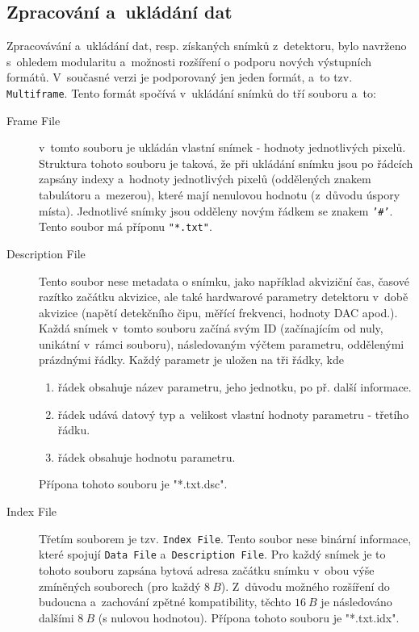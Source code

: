 \subsection{Zpracování a~ukládání dat}\label{atlas:cont:output}
Zpracovávání a~ukládání dat, resp. získaných snímků z~detektoru, bylo navrženo s~ohledem modularitu a~možnosti rozšíření o podporu nových výstupních formátů. V~současné verzi je podporovaný jen jeden formát, a~to tzv. \texttt{Multiframe}. Tento formát spočívá v~ukládání snímků do tří souboru a~to:
\begin{description}
	\item[Frame File] v~tomto souboru je ukládán vlastní snímek - hodnoty jednotlivých pixelů. Struktura tohoto souboru je taková, že při ukládání snímku jsou po řádcích zapsány indexy a~hodnoty jednotlivých pixelů (oddělených znakem tabulátoru a~mezerou), které mají nenulovou hodnotu (z~důvodu úspory místa). Jednotlivé snímky jsou odděleny novým řádkem se znakem \texttt{'\#'}. Tento soubor má příponu \texttt{"*.txt"}.
	\item[Description File] Tento soubor nese metadata o snímku, jako například akviziční čas, časové razítko začátku akvizice, ale také hardwarové parametry detektoru v~době akvizice (napětí detekčního čipu, měřící frekvenci, hodnoty DAC apod.). Každá snímek v~tomto souboru začíná svým ID (začínajícím od nuly, unikátní v~rámci souboru), následovaným výčtem parametru, oddělenými prázdnými řádky. Každý parametr je uložen na tři řádky, kde
		\begin{enumerate}
			\item řádek obsahuje název parametru, jeho jednotku, po př. další informace.
			\item řádek udává datový typ a~velikost vlastní hodnoty parametru - třetího řádku.
			\item řádek obsahuje hodnotu parametru.
		\end{enumerate}
	Přípona tohoto souboru je "*.txt.dsc".
	\item[Index File] Třetím souborem je tzv. \texttt{Index File}. Tento soubor nese binární informace, které spojují \texttt{Data File} a~\texttt{Description File}. Pro každý snímek je to tohoto souboru zapsána bytová adresa začátku snímku v~obou výše zmíněných souborech (pro každý $8~B$). Z~důvodu možného rozšíření do budoucna a~zachování zpětné kompatibility, těchto $16~B$ je následováno dalšími $8~B$ (s nulovou hodnotou). Přípona tohoto souboru je "*.txt.idx".
\end{description}

